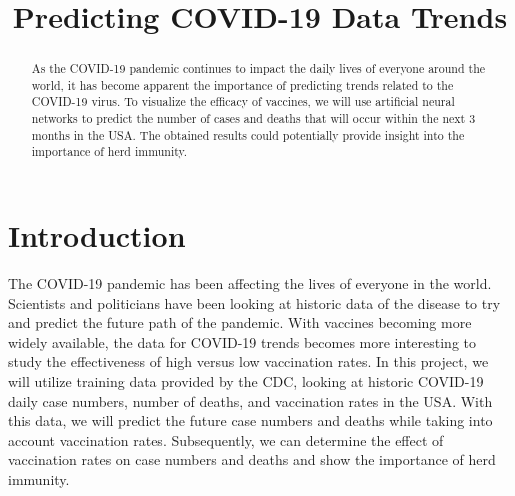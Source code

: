\documentclass[conference]{IEEEtran}
\begin{document}
\title{Predicting COVID-19 Data Trends}

\author{
\and
{}
\and
{}
}

\maketitle


\begin{abstract}
As the COVID-19 pandemic continues to impact the daily lives of everyone around the world, it has become apparent the importance of predicting trends related to the COVID-19 virus. To visualize the efficacy of vaccines, we will use artificial neural networks to predict the number of cases and deaths that will occur within the next 3 months in the USA. The obtained results could potentially provide insight into the importance of herd immunity. 
\end{abstract}

\section{Introduction}
The COVID-19 pandemic has been affecting the lives of everyone in the world. Scientists and politicians have been looking at historic data of the disease to try and predict the future path of the pandemic. With vaccines becoming more widely available, the data for COVID-19 trends becomes more interesting to study the effectiveness of high versus low vaccination rates. In this project, we will utilize training data provided by the CDC, looking at historic COVID-19 daily case numbers, number of deaths, and vaccination rates in the USA. With this data, we will predict the future case numbers and deaths while taking into account vaccination rates. Subsequently, we can determine the effect of vaccination rates on case numbers and deaths and show the importance of herd immunity. 
\end{document}
